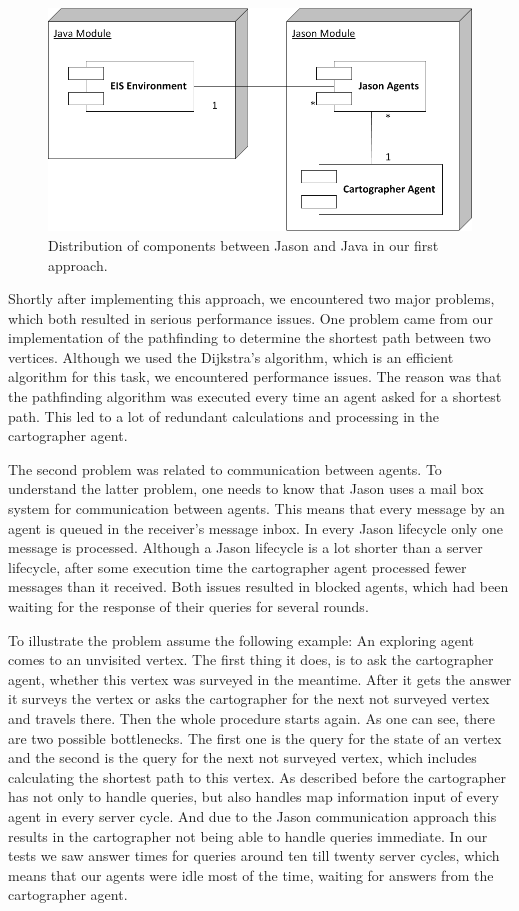 \begin{figure}
  \centering
  \includegraphics[width=0.7\linewidth]{images/map_comp_1.png}
  \caption{Distribution of components between Jason and Java in our first approach.}
  \label{fig:map:comp1}
\end{figure}

Shortly after implementing this approach, we encountered two major problems, which both resulted in serious performance issues.
One problem came from our implementation of the pathfinding to determine the shortest path between two vertices.
Although we used the Dijkstra's algorithm, which is an efficient algorithm for this task, we encountered performance issues.
The reason was that the pathfinding algorithm was executed every time an agent asked for a shortest path.
This led to a lot of redundant calculations and processing in the cartographer agent.

The second problem was related to communication between agents.
To understand the latter problem, one needs to know that Jason uses a mail box system for communication between agents.
This means that every message by an agent is queued in the receiver's message inbox.
In every Jason lifecycle only one message is processed.
Although a Jason lifecycle is a lot shorter than a server lifecycle, after some execution time the cartographer agent processed fewer messages than it received.
Both issues resulted in blocked agents, which had been waiting for the response of their queries for several rounds.

To illustrate the problem assume the following example: An exploring agent comes to an unvisited vertex.
The first thing it does, is to ask the cartographer agent, whether this vertex was surveyed in the meantime.
After it gets the answer it surveys the vertex or asks the cartographer for the next not surveyed vertex and travels there.
Then the whole procedure starts again.
As one can see, there are two possible bottlenecks.
The first one is the query for the state of an vertex and the second is the query for the next not surveyed vertex, which includes calculating the shortest path to this vertex.
As described before the cartographer has not only to handle queries, but also handles map information input of every agent in every server cycle.
And due to the Jason communication approach this results in the cartographer not being able to handle queries immediate.
In our tests we saw answer times for queries around ten till twenty server cycles, which means that our agents were idle most of the time, waiting for answers from the cartographer agent.


